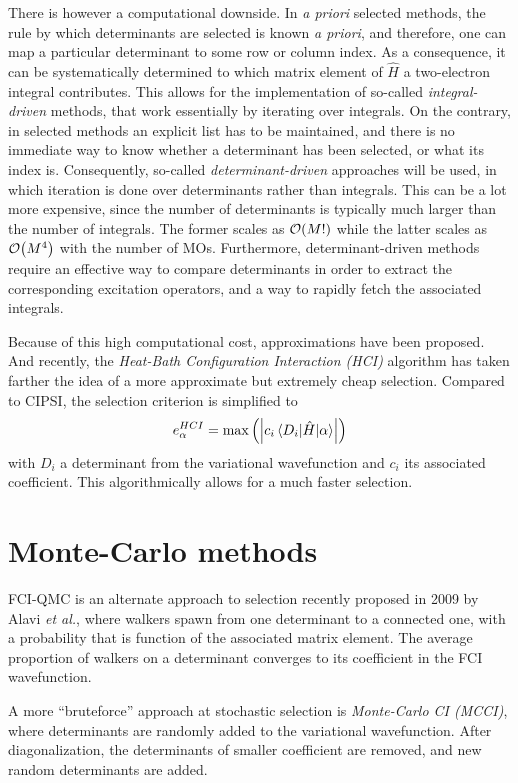 \documentclass[./thesis.tex]{subfiles}
\begin{document}
There is however a computational downside. In \textit{a priori} selected methods, the rule by which determinants are selected is known \textit{a priori}, and therefore, one can map a particular determinant to some row or column index.\cite{Knowles_1984} As a consequence, it can be systematically determined to which matrix element of $\widehat{H}$ a two-electron integral contributes. This allows for the implementation of so-called \emph{integral-driven} methods, that work essentially by iterating over integrals.
On the contrary, in selected methods an explicit list has to be maintained, and there is no immediate way to know whether a determinant has been selected, or what its index is. Consequently, so-called \emph{determinant-driven} approaches will be used, in which iteration is done over determinants rather than integrals. This can be a lot more expensive, since the number of determinants is typically much larger than the number of integrals. The former scales as $\order{M!}$ while the latter scales as $\order{M^4}$ with the number of MOs.
Furthermore, determinant-driven methods require an effective way to compare determinants in order to extract the corresponding excitation operators, and a way to rapidly fetch the associated integrals.

Because of this high computational cost, approximations have been proposed.\cite{Evangelisti_1983} And recently, the \emph{Heat-Bath Configuration Interaction (HCI)} algorithm has taken farther the idea of a more approximate but extremely cheap selection.\cite{Holmes_2016, Sharma_2017} Compared to CIPSI, the selection criterion is simplified to
\begin{equation}
e^{HCI}_\alpha = \max \qty( \qty| c_i \mel{D_i}{\hat{H}}{\alpha} | )
\end{equation}
with $D_i$ a determinant from the variational wavefunction and $c_i$ its associated coefficient. This algorithmically allows for a much faster selection.

\section{Monte-Carlo methods}
FCI-QMC is an alternate approach to selection recently proposed in 2009 by Alavi \textit{et al.},\cite{Booth_2009,Booth_2010,Cleland_2010} where walkers spawn from one determinant to a connected one, with a probability that is function of the associated matrix element. The average proportion of walkers on a determinant converges to its coefficient in the FCI wavefunction.

A more ``bruteforce'' approach at stochastic selection is \emph{Monte-Carlo CI (MCCI)},\cite{Greer_1995,Greer_1998} where determinants are randomly added to the variational wavefunction. After diagonalization, the determinants of smaller coefficient are removed, and new random determinants are added.
\end{document}

